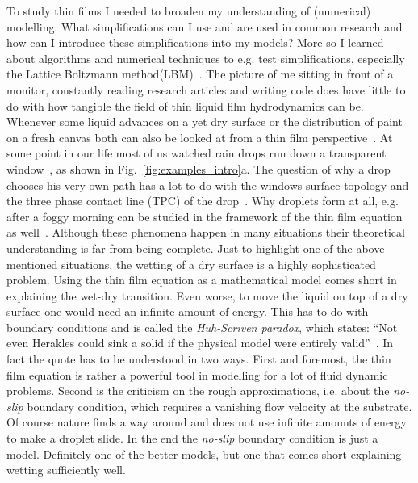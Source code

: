 To study thin films I needed to broaden my understanding of (numerical) modelling. 
What simplifications can I use and are used in common research and how can I introduce these simplifications into my models? 
More so I learned about algorithms and numerical techniques to e.g. test simplifications, especially the Lattice Boltzmann method(LBM)~\cite{doi:10.1146/annurev.fluid.30.1.329, PhysRevE.56.6811, PhysRevE.65.046308, krueger2017}.
The picture of me sitting in front of a monitor, constantly reading research articles and writing code does have little to do with how tangible the field of thin liquid film hydrodynamics can be.
Whenever some liquid advances on a yet dry surface or the distribution of paint on a fresh canvas both can also be looked at from a thin film perspective~\cite{THIELE2014399, RevModPhys.69.931, Edwardse1600183}. 
At some point in our life most of us watched rain drops run down a transparent window~\cite{PhysRevLett.119.204501}, as shown in Fig.~\ref{fig:examples_intro}a. 
The question of why a drop chooses his very own path has a lot to do with the windows surface topology and the three phase contact line (TPC) of the drop~\cite{cassie1944wettability, suzuki2008sliding, doi:10.1021/acs.langmuir.5b02335}. 
Why droplets form at all, e.g.  after a foggy morning can be studied in the framework of the thin film equation as well~\cite{zhang2015inkjet,shi2018fog}.
Although these phenomena happen in many situations their theoretical understanding is far from being complete.
Just to highlight one of the above mentioned situations, the wetting of a dry surface is a highly sophisticated problem.
Using the thin film equation as a mathematical model comes short in explaining the wet-dry transition.
Even worse, to move the liquid on top of a dry surface one would need an infinite amount of energy.
This has to do with boundary conditions and is called the \textit{Huh-Scriven paradox}, which states: ``Not even Herakles could sink a solid if the physical model were entirely valid''~\cite{HUH197185}.
In fact the quote has to be understood in two ways. 
First and foremost, the thin film equation is rather a powerful tool in modelling for a lot of fluid dynamic problems.
Second is the criticism on the rough approximations, i.e. about the \textit{no-slip} boundary condition, which requires a vanishing flow velocity at the substrate.
Of course nature finds a way around and does not use infinite amounts of energy to make a droplet slide. 
In the end the \textit{no-slip} boundary condition is just a model.
Definitely one of the better models, but one that comes short explaining wetting sufficiently well.

